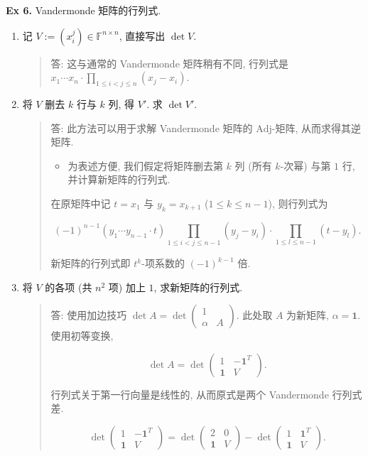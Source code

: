 \documentclass[
]{ctexart}
\begin{document}
\textbf{Ex 6.} Vandermonde 矩阵的行列式.

\begin{enumerate}
\def\labelenumi{\arabic{enumi}.}
\item
  记 \(V:=(x_i^j)\in \mathbb F^{n\times n}\), 直接写出 \(\det V\).

  \begin{quote}
  答: 这与通常的 Vandermonde 矩阵稍有不同, 行列式是
  \(x_1\cdots x_n\cdot \prod_{1\leq i<j\leq n}(x_j-x_i)\).
  \end{quote}
\item
  将 \(V\) 删去 \(k\) 行与 \(k\) 列, 得 \(V'\). 求 \(\det V'\).

  \begin{quote}
  答: 此方法可以用于求解 Vandermonde 矩阵的 \(\mathrm{Adj}\)-矩阵,
  从而求得其逆矩阵.

  \begin{itemize}
  \item
    为表述方便, 我们假定将矩阵删去第 \(k\) 列 (所有 \(k\)-次幂) 与第
    \(1\) 行, 并计算新矩阵的行列式.
  \end{itemize}

  在原矩阵中记 \(t=x_1\) 与 \(y_k=x_{k+1}\) (\(1\leq k \leq n-1\)),
  则行列式为

  \[(-1)^{n-1}(y_1\cdots y_{n-1}\cdot t)\prod_{1\leq i<j\leq n-1}(y_j-y_i)\cdot \prod_{1\leq l\leq n-1}(t-y_l).\]

  新矩阵的行列式即 \(t^k\)-项系数的 \((-1)^{k-1}\) 倍.
  \end{quote}
\item
  将 \(V\) 的各项 (共 \(n^2\) 项) 加上 \(1\), 求新矩阵的行列式.

  \begin{quote}
  答: 使用加边技巧
  \(\det A=\det \begin{pmatrix}1&\\\alpha &A\end{pmatrix}\). 此处取
  \(A\) 为新矩阵, \(\alpha=\mathbf 1\). 使用初等变换,

  \[\det A = \det \begin{pmatrix}1&-\mathbf 1^T\\\mathbf 1 & V\end{pmatrix}.\]

  行列式关于第一行向量是线性的, 从而原式是两个 Vandermonde 行列式差.

  \[\det \begin{pmatrix}1&-\mathbf 1^T\\\mathbf 1 & V\end{pmatrix}=\det \begin{pmatrix}2&0\\\mathbf 1 & V\end{pmatrix}-\det \begin{pmatrix}1&\mathbf 1^T\\\mathbf 1 & V\end{pmatrix}.\]


\end{quote}
\end{enumerate}
\end{document}
